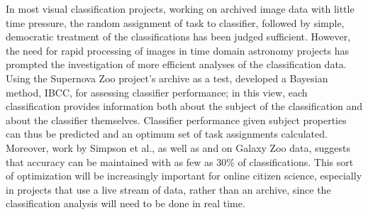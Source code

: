 \documentclass{ar2e}
\begin{document}
In most visual classification projects, working on archived image data with
little time pressure, the random assignment of task to classifier, followed by
simple, democratic treatment of the classifications has been judged sufficient.
However, the need for rapid processing of images in time domain astronomy
projects has prompted the investigation of more efficient analyses of the
classification data.  Using the Supernova Zoo project's archive as a test,
\citet{Simpson++2012IBCC} developed a Bayesian method, IBCC, for assessing
classifier performance; in this view, each classification provides information
both about the subject of the classification and about the classifier
themselves. Classifier performance given subject properties can thus be
predicted and an optimum set of task assignments calculated. 
Moreover, work by Simpson et al., as well as \citet{Kamar} and \citet{Waterhouse} on
Galaxy Zoo data, suggests that accuracy can be maintained with as few as 30\% of
classifications. 
This sort of optimization will be increasingly important for online citizen
science, especially in projects that use a live stream of data, rather than
an archive, since the classification analysis will need to be done in real time.


\end{document}

